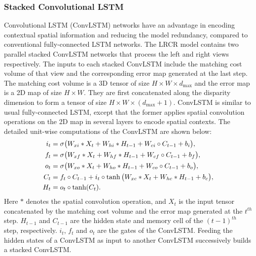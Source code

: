 \documentclass[10pt,twocolumn,letterpaper]{article}
\begin{document}
\subsubsection{Stacked Convolutional LSTM}
Convolutional LSTM (ConvLSTM) networks have an advantage in encoding contextual spatial information and reducing the model redundancy, compared to  conventional fully-connected LSTM networks. The LRCR model contains two parallel stacked ConvLSTM  networks that process the left and  right views respectively. The inputs to each stacked ConvLSTM include the matching cost volume of that view and the corresponding error map  generated at the last step. The matching cost volume is a 3D tensor of size $H \times W \times d_{\max}$ and the error map is a 2D map of size  $H \times W $. They are first concatenated along the disparity dimension to form a tensor of size $H \times W \times (d_{\max}+1)$. ConvLSTM is similar to  usual fully-connected LSTM, except that the former applies  spatial convolution operations  on the 2D map  in several layers  to encode   spatial contexts. The detailed unit-wise computations of the ConvLSTM are shown below:
\begin{equation}
\vspace{-0cm}
\begin{aligned}
i_{t} &=  \sigma\big(W_{xi}*X_{t}+W_{hi}*H_{t-1}+W_{ci}\circ C_{t-1}+b_{i}\big), \\
f_{t} &=  \sigma\big(W_{xf}*X_{t}+W_{hf}*H_{t-1}+W_{cf}\circ C_{t-1}+b_{f}\big), \\
o_{t} &=  \sigma\big(W_{xo}*X_{t}+W_{ho}*H_{t-1}+W_{co}\circ C_{t-1}+b_{o}\big), \\
C_{t} &=  f_{t}\circ C_{t-1} + i_{t}\circ \tanh\big(W_{xc}*X_{t}+W_{hc}*H_{t-1}+b_{c}\big), \\
H_{t} &=  o_{t}\circ \tanh(C_{t}).
\end{aligned}
\label{eq:eq1}
\vspace{-0cm}
\end{equation}
Here $ * $ denotes the spatial convolution operation, and $X_{t}$ is the input tensor concatenated by the matching cost volume and the error map generated at the $t^{th}$ step. $H_{t-1}$ and $C_{t-1}$ are the hidden state and memory cell of the $(t-1)^{th}$ step, respectively. $i_{t}$, $f_{t}$ and $o_{t}$ are the gates of the ConvLSTM. Feeding the hidden states of a ConvLSTM as  input to another ConvLSTM successively  builds a stacked ConvLSTM. 
\end{document}

